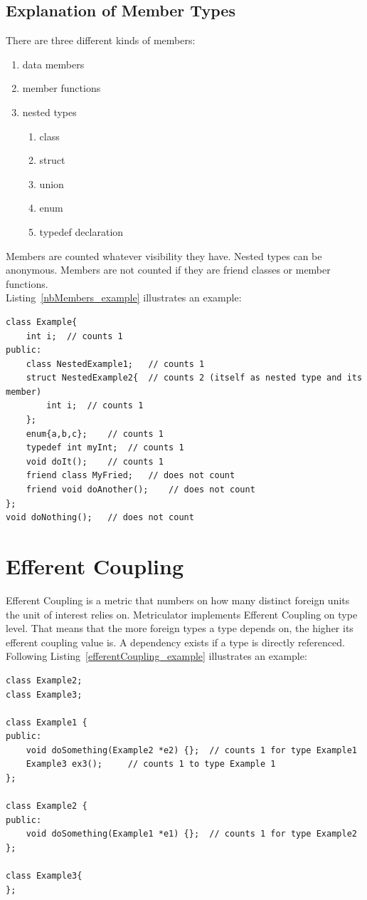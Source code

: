 \documentclass[11pt,a4paper,oneside]{scrreprt}
\begin{document}
\subsection{Explanation of Member Types}
There are three different kinds of members:
\begin{enumerate}
\item data members
\item member functions
\item nested types
\begin{enumerate}
\item class
\item struct
\item union
\item enum
\item typedef declaration
\end{enumerate}
\end{enumerate}

Members are counted whatever visibility they have. Nested types can be anonymous. Members are not counted if they are friend classes or member functions.\\
Listing~\ref{nbMembers_example} illustrates an example:
\begin{lstlisting}[style=C++0x, caption=Code snippet for Number of  Members per Type, label=nbMembers_example] 
class Example{
	int i;	// counts 1
public:
	class NestedExample1;	// counts 1
	struct NestedExample2{	// counts 2 (itself as nested type and its member)
		int i;	// counts 1
	};
	enum{a,b,c};	// counts 1
	typedef int myInt;	// counts 1
	void doIt();	// counts 1
	friend class MyFried;	// does not count
	friend void doAnother();	// does not count
};
void doNothing();	// does not count
\end{lstlisting}

\section{Efferent Coupling}\label{effcoupling}
Efferent Coupling is a metric that numbers on how many distinct foreign units the unit of interest relies on. Metriculator implements Efferent Coupling on type level. That means that the more foreign types a type depends on, the higher its efferent coupling value is. A dependency exists if a type is directly referenced.\\
Following Listing~\ref{efferentCoupling_example} illustrates an example:
\begin{lstlisting}[style=C++0x, caption=Code snippet for Efferent Coupling, label=efferentCoupling_example] 
class Example2;
class Example3;

class Example1 {
public:
	void doSomething(Example2 *e2) {};	// counts 1 for type Example1
	Example3 ex3();		// counts 1 to type Example 1
};

class Example2 {
public:
	void doSomething(Example1 *e1) {};	// counts 1 for type Example2
};

class Example3{
};
\end{lstlisting}
\end{document}
